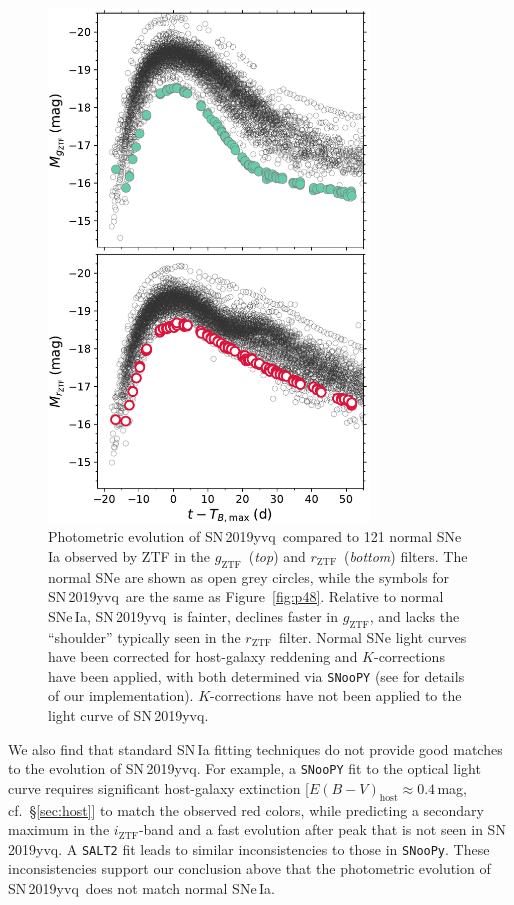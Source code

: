 \documentclass[twocolumn]{aastex63}
\newcommand{\rztf}{$r_\mathrm{ZTF}$}
\newcommand{\gztf}{$g_\mathrm{ZTF}$}
\newcommand{\iztf}{$i_\mathrm{ZTF}$}
\newcommand{\sn}{SN\,2019yvq}
\begin{document}
\begin{figure}
    \centering
    \includegraphics[width=3.35in]{./figures/abs_mag_host_ebv_kcorr.pdf}
    \caption{Photometric evolution of \sn\ compared to 121 normal SNe\,Ia
    observed by ZTF \citep{Yao19} in the \gztf\ (\textit{top}) and \rztf\
    (\textit{bottom}) filters. The normal SNe are shown as open grey circles,
    while the symbols for \sn\ are the same as Figure~\ref{fig:p48}. Relative
    to normal SNe\,Ia, \sn\ is fainter, declines faster in \gztf, and lacks
    the ``shoulder'' typically seen in the \rztf\ filter. Normal SNe light
    curves have been corrected for host-galaxy reddening and $K$-corrections
    have been applied, with both determined via \texttt{SNooPY} (see
    \citealt{Bulla20} for details of our implementation). $K$-corrections have
    not been applied to the light curve of \sn.}
    \label{fig:lc_comp}
\end{figure}

We also find that standard SN\,Ia fitting techniques do not provide good
matches to the evolution of \sn. For example, a \texttt{SNooPY}
\citep{Burns11} fit to the optical light curve requires significant
host-galaxy extinction [$E(B-V)_\mathrm{host}\approx0.4$\,mag, cf.\
\S\ref{sec:host}] to match the observed red colors, while predicting a
secondary maximum in the \iztf-band and a fast evolution after peak that is
not seen in \sn. A \texttt{SALT2} \citep{Guy07} fit leads to similar
inconsistencies to those in \texttt{SNooPy}. These inconsistencies support our
conclusion above that the photometric evolution of \sn\ does not match normal
SNe\,Ia.
\end{document}
